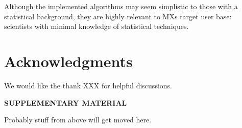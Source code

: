 \documentclass[12pt]{article}
\begin{document}
Although the implemented algorithms may seem simplistic to those with a statistical background, they are highly relevant to MXs target user base: scientists with minimal knowledge of statistical techniques.

\section{Acknowledgments}
\label{sec:ack}
We would like the thank XXX for helpful discussions.

\bigskip
\begin{center}
{\large\bf SUPPLEMENTARY MATERIAL}
\end{center}

Probably stuff from above will get moved here.




\end{document}
